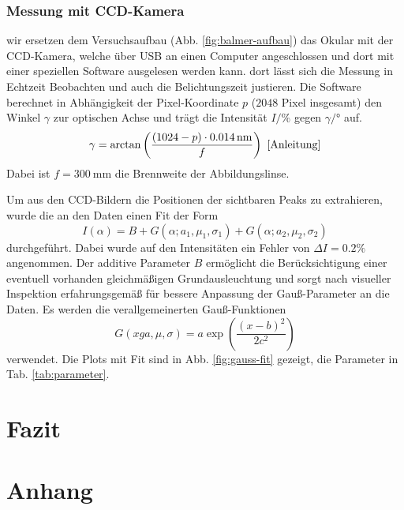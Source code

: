 \documentclass{article}
\begin{document}
\subsubsection{Messung mit CCD-Kamera}
wir ersetzen dem Versuchsaufbau (Abb. \ref{fig:balmer-aufbau}) das Okular mit der CCD-Kamera,
welche über USB an einen Computer angeschlossen und dort mit einer speziellen Software ausgelesen werden kann. 
dort lässt sich die Messung in Echtzeit Beobachten und auch die Belichtungszeit justieren.
Die Software berechnet in Abhängigkeit der Pixel-Koordinate $p$ ($2048$ Pixel insgesamt) den Winkel $\gamma$ zur optischen Achse
und trägt die Intensität $I/\%$ gegen $\gamma/°$ auf.
\[
  \gamma = \arctan\left( \frac{(1024-p)\cdot \SI{0.014}{\nm}}{f} \right)\ \cite{Anleitung}
\]
Dabei ist $f=\SI{300}{\mm}$ die Brennweite der Abbildungslinse.

Um aus den CCD-Bildern die Positionen der sichtbaren Peaks zu extrahieren, wurde die an den Daten einen Fit der Form
\[
  I(\alpha) = B + G(\alpha; a_1, \mu_1, \sigma_1) + G(\alpha; a_2, \mu_2, \sigma_2)
\]
durchgeführt. Dabei wurde auf den Intensitäten ein Fehler von $\Delta I = 0.2\%$ angenommen.
Der additive Parameter $B$ ermöglicht die Berücksichtigung einer eventuell vorhanden gleichmäßigen Grundausleuchtung
und sorgt nach visueller Inspektion erfahrungsgemäß für bessere Anpassung der Gauß-Parameter an die Daten.
Es werden die verallgemeinerten Gauß-Funktionen
\[
  G(xg a, \mu, \sigma) = a \exp(\frac{(x-b)^2}{2c^2})
\]
verwendet. 
Die Plots mit Fit sind in Abb. \ref{fig:gauss-fit} gezeigt, die Parameter in Tab. \ref{tab:parameter}.




\clearpage
\section{Fazit}


\clearpage
\section{Anhang}
\end{document}
